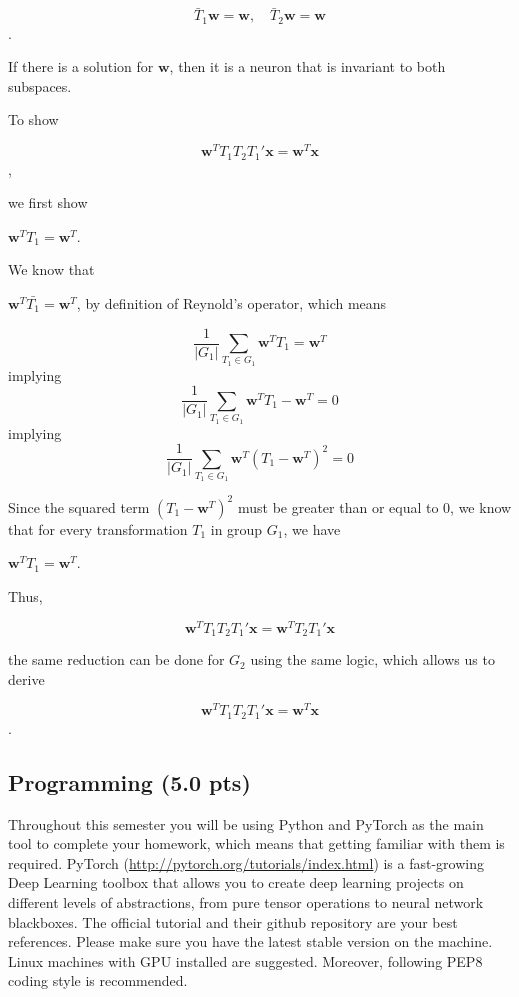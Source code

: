 \documentclass{article}
\begin{document}
\begin{enumerate}
$$\bar{T}_1 \mathbf{w} = \mathbf{w}, \quad \bar{T}_2 \mathbf{w} = \mathbf{w}$$.

If there is a solution for $\mathbf{w}$, then it is a neuron that is invariant to both subspaces.

To show

$$\mathbf{w}^T T_1 T_2 T_1' \mathbf{x} = \mathbf{w}^T \mathbf{x}$$,

we first show 

$\mathbf{w}^T T_1 = \mathbf{w}^T$.

We know that 

$\mathbf{w}^T \bar{T_1} = \mathbf{w}^T$, by definition of Reynold's operator, which means

$$\frac{1}{|G_1|} \sum_{T_1 \in G_1} \mathbf{w}^T T_1 = \mathbf{w}^T$$
implying
$$\frac{1}{|G_1|} \sum_{T_1 \in G_1} \mathbf{w}^T T_1 - \mathbf{w}^T = 0$$
implying
$$\frac{1}{|G_1|} \sum_{T_1 \in G_1} \mathbf{w}^T (T_1 - \mathbf{w}^T)^2 = 0$$

Since the squared term $(T_1 - \mathbf{w}^T)^2$ must be greater than or equal to
$0$, we know that for every transformation $T_1$ in group $G_1$, we have 

$\mathbf{w}^T T_1 = \mathbf{w}^T$.


Thus, 

$$\mathbf{w}^T T_1 T_2 T_1' \mathbf{x} = \mathbf{w}^T T_2 T_1' \mathbf{x}$$

the same reduction can be done for $G_2$ using the same logic, which allows us to derive 

$$\mathbf{w}^T T_1 T_2 T_1' \mathbf{x} = \mathbf{w}^T \mathbf{x}$$.


\vspace{3in}

\end{enumerate}


\newpage
\subsection*{Programming (5.0 pts)}

Throughout this semester you will be using Python and PyTorch as the main tool
to complete your homework, which means that getting familiar with them is
required.  PyTorch (\url{http://pytorch.org/tutorials/index.html}) is a
fast-growing Deep Learning toolbox that allows you to create deep learning
projects on different levels of abstractions, from pure tensor operations to
neural network blackboxes. The official tutorial and their github repository are
your best references. Please make sure you have the latest stable version on the
machine.  Linux machines with GPU installed are suggested. Moreover, following
PEP8 coding style is recommended.
\end{document}
